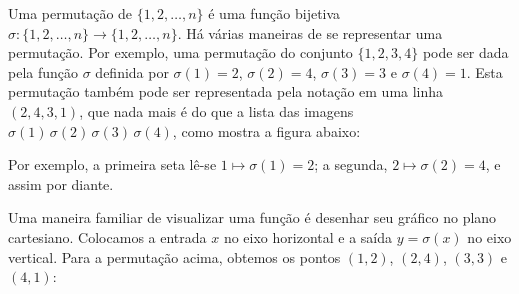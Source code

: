 \documentclass[12pt,portuguese]{article}
\theoremstyle{definition}
\begin{document}
Uma permutação de $\{1,2,\ldots,n\}$ é uma função bijetiva
$\sigma:\{1,2,\ldots,n\}\to\{1,2,\ldots,n\}$. 
Há várias maneiras de se representar uma permutação. Por exemplo, uma
permutação do conjunto $\{1,2,3,4\}$ pode ser dada pela função $\sigma$
definida por $\sigma(1)=2$, $\sigma(2)=4$, $\sigma(3)=3$ e $\sigma(4)=1$.
Esta permutação também pode ser representada pela notação em uma linha
$(2,4,3,1)$, que nada mais é do que a lista das imagens
$\sigma(1)\,\sigma(2)\,\sigma(3)\,\sigma(4)$, como mostra a figura abaixo:
\begin{center}
\end{center}
Por exemplo, a primeira seta lê-se $1\mapsto\sigma(1)=2$; a segunda,
$2\mapsto\sigma(2)=4$, e assim por diante.

Uma maneira familiar de visualizar uma função é desenhar seu gráfico no
plano cartesiano. Colocamos a entrada $x$ no eixo horizontal e a saída
$y=\sigma(x)$ no eixo vertical. Para a permutação acima, obtemos os pontos
$(1,2)$, $(2,4)$, $(3,3)$ e $(4,1)$:
\end{document}
